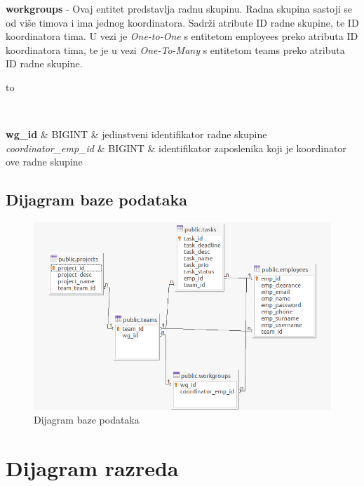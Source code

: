 				\textbf{workgroups} - Ovaj entitet predstavlja radnu skupinu. Radna skupina sastoji se od više timova i ima jednog koordinatora. Sadrži atribute ID radne skupine, te ID koordinatora tima. U vezi je \textit{One-to-One} s entitetom employees preko atributa ID koordinatora tima, te je u vezi \textit{One-To-Many} s entitetom teams preko atributa ID radne skupine.
				\begin{longtabu} to \textwidth {|X[10, l]|X[6, l]|X[20, l]|}
					
					\hline {}	 \\[3pt] \hline
					\endfirsthead
					\hline 
					\endlastfoot
					
					\textbf{wg\_id}		 & BIGINT	&  jedinstveni identifikator radne skupine 	\\ \hline
					\textit{coordinator\_emp\_id} 	& BIGINT & identifikator zaposlenika koji je koordinator ove radne skupine  	\\ \hline 
				\end{longtabu}
			
			
			\subsection{Dijagram baze podataka}
			\begin{figure}[H]
				\includegraphics[width=\textwidth]{slike/dijagram_baze.png}
				\centering
				\caption{Dijagram baze podataka}
				\label{fig:dijagram_baze}
			\end{figure}
			
			\eject
			
			
		\section{Dijagram razreda}
		
